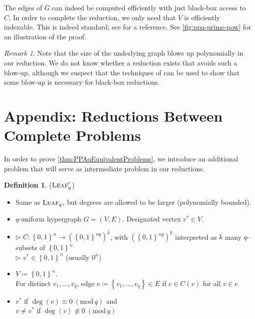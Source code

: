 \documentclass[10pt,a4paper]{article}
\theoremstyle{definition}
\newtheorem{definition}[theorem]{Definition}
\theoremstyle{remark}
\newtheorem{remark}[theorem]{Remark}
\newcommand{\contour}[2]{#2}
\newcommand{\inparen}[1]{\left ( #1 \right )}
\renewcommand{\mod}[1]{~\inparen{\mathrm{mod}~#1}}
\def\set#1{\left\{#1\right\}}
\newcommand{\bit}{\ensuremath{\set{0,1}}}
\newcommand{\leaf}{\ensuremath\textsc{Leaf}}
\begin{document}
The edges of $\overline{G}$ can indeed be computed efficiently with just black-box access to $C$. In order to complete the reduction, we only need that $\overline{V}$ is efficiently indexable. This is indeed standard; see \cite[\S2.3]{r31} for a reference. See \autoref{fig:ppa-prime-pow} for an illustration of the proof.

\begin{remark}
Note that the size of the underlying graph blows up polynomially in our reduction. We do not know whether a reduction exists that avoids such a blow-up, although we suspect that the techniques of \cite{r6} can be used to show that some blow-up is necessary for black-box reductions.
\end{remark}


 

\appendix
\setcounter{section}{0}
\setcounter{theorem}{46}
\section{Appendix: Reductions Between Complete Problems}
\label{sec:equivalences}

In order to prove \autoref{thm:PPAqEquivalentProblems}, we introduce an additional problem that will serve as intermediate problem in our reductions.\\[1mm]


\noindent
\begin{minipage}{\linewidth}
\begin{definition}
	\label{def:leaf-prime} \contour{black}{($\leaf'_q$)}\vspace{-5pt}
	\begin{itemize}[leftmargin=2.15cm,itemsep=4pt]
		\item[\slshape Principle:] Same as $\leaf_q$, but degrees are allowed to be larger (polynomially bounded).
		\item[\slshape Object:] $q$-uniform hypergraph $G = (V, E)$. Designated vertex $v^* \in V$.
		\item[\slshape Inputs:] $\triangleright$ $C:\bit^n \to (\bit^{nq})^k$, with $(\bit^{nq})^k$ interpreted as $k$ many $q$-subsets of $\bit^n$\\
	$\triangleright$ $v^* \in \bit^n$ (usually $0^n$)
		\item[\slshape Encoding:] $V\coloneqq\bit^n$.\\
	For distinct $v_1, \ldots, v_q$, edge $e\coloneqq\set{v_1, \ldots, v_q}\in E$ if $e \in C(v)$ for all $v \in e$
		\item[\slshape Solutions:] $v^*$ if $\deg(v) \equiv 0 \mod{q}$ and\\
	$v \ne v^*$ if $\deg(v) \not\equiv 0 \mod{q}$
	\end{itemize}
\end{definition}
\end{minipage}\vspace{5mm}
\end{document}
